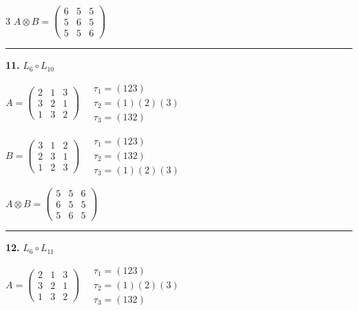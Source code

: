 \begin{multicols}{3}
$A \otimes B = \begin{pmatrix} 6 & 5 & 5 \\ 5 & 6 & 5 \\ 5 & 5 & 6 \end{pmatrix}$

\vspace{0.3em}
\hrule
\vspace{0.3em}

\noindent\textbf{11.} $L_{6} \circ L_{10}$

$A = \begin{pmatrix} 2 & 1 & 3 \\ 3 & 2 & 1 \\ 1 & 3 & 2 \end{pmatrix} \quad \begin{matrix} \tau_{1}=(1 2 3) \\ \tau_{2}=(1)(2)(3) \\ \tau_{3}=(1 3 2) \end{matrix}$

$B = \begin{pmatrix} 3 & 1 & 2 \\ 2 & 3 & 1 \\ 1 & 2 & 3 \end{pmatrix} \quad \begin{matrix} \tau_{1}=(1 2 3) \\ \tau_{2}=(1 3 2) \\ \tau_{3}=(1)(2)(3) \end{matrix}$

$A \otimes B = \begin{pmatrix} 5 & 5 & 6 \\ 6 & 5 & 5 \\ 5 & 6 & 5 \end{pmatrix}$

\vspace{0.3em}
\hrule
\vspace{0.3em}

\noindent\textbf{12.} $L_{6} \circ L_{11}$

$A = \begin{pmatrix} 2 & 1 & 3 \\ 3 & 2 & 1 \\ 1 & 3 & 2 \end{pmatrix} \quad \begin{matrix} \tau_{1}=(1 2 3) \\ \tau_{2}=(1)(2)(3) \\ \tau_{3}=(1 3 2) \end{matrix}$


\end{multicols}
